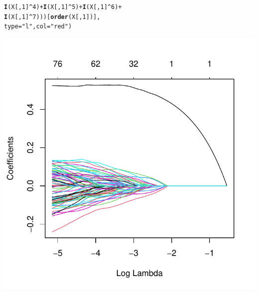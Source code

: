 \documentclass[a4paper]{article}
\makeatletter
\def\maxwidth{ %
  \ifdim\Gin@nat@width>\linewidth
    \linewidth
  \else
    \Gin@nat@width
  \fi
}
\newcommand{\hlnum}[1]{\textcolor[rgb]{0.686,0.059,0.569}{#1}}%
\newcommand{\hlstr}[1]{\textcolor[rgb]{0.192,0.494,0.8}{#1}}%
\newcommand{\hlopt}[1]{\textcolor[rgb]{0,0,0}{#1}}%
\newcommand{\hlstd}[1]{\textcolor[rgb]{0.345,0.345,0.345}{#1}}%
\newcommand{\hlkwc}[1]{\textcolor[rgb]{0.333,0.667,0.333}{#1}}%
\newcommand{\hlkwd}[1]{\textcolor[rgb]{0.737,0.353,0.396}{\textbf{#1}}}%
\newenvironment{kframe}{%
 \def\at@end@of@kframe{}%
 \ifinner\ifhmode%
  \def\at@end@of@kframe{\end{minipage}}%
  \begin{minipage}{\columnwidth}%
 \fi\fi%
 \def\FrameCommand##1{\hskip\@totalleftmargin \hskip-\fboxsep
 \colorbox{shadecolor}{##1}\hskip-\fboxsep
     \hskip-\linewidth \hskip-\@totalleftmargin \hskip\columnwidth}%
 \MakeFramed {\advance\hsize-\width
   \@totalleftmargin\z@ \linewidth\hsize
   \@setminipage}}%
 {\par\unskip\endMakeFramed%
 \at@end@of@kframe}
\newenvironment{knitrout}{}{} %
\makeatother
\begin{document}
{\begin{enumerate}
\begin{itemize}
\begin{knitrout}
\begin{kframe}
\begin{alltt}
                        \hlkwd{I}\hlstd{(X[,}\hlnum{1}\hlstd{]}\hlopt{^}\hlnum{4}\hlstd{)} \hlopt{+} \hlkwd{I}\hlstd{(X[,}\hlnum{1}\hlstd{]}\hlopt{^}\hlnum{5}\hlstd{)} \hlopt{+} \hlkwd{I}\hlstd{(X[,}\hlnum{1}\hlstd{]}\hlopt{^}\hlnum{6}\hlstd{)} \hlopt{+}
                        \hlkwd{I}\hlstd{(X[,}\hlnum{1}\hlstd{]}\hlopt{^}\hlnum{7}\hlstd{)))[}\hlkwd{order}\hlstd{(X[,}\hlnum{1}\hlstd{])],}
       \hlkwc{type}\hlstd{=}\hlstr{"l"}\hlstd{,} \hlkwc{col}\hlstd{=}\hlstr{"red"}\hlstd{)}
\end{alltt}
\end{kframe}
\includegraphics[width=\maxwidth]{figure/unnamed-chunk-5-1} 
\end{knitrout}


\end{itemize}
\end{enumerate}}
\end{document}
